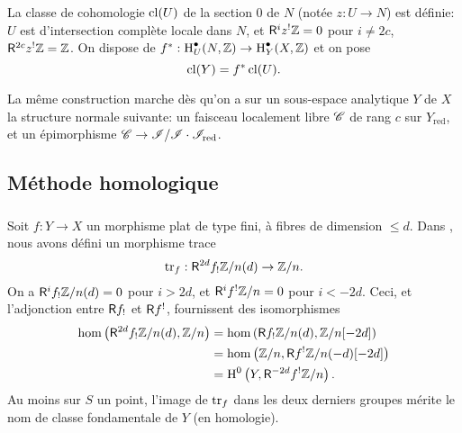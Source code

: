 {La classe de cohomologie $\operatorname{cl}(U)$ de la section $0$ de $N$ (not\'ee $z:U\to N$) 
est d\'efinie: $U$ est d'intersection compl\`ete locale dans $N$, et 
$\mathsf{R}^i z^!\mathbb{Z} = 0$ pour $i\ne 2 c$, $\mathsf{R}^{2 c} z^!\mathbb{Z} = \mathbb{Z}$. On dispose de 
$f^*:\operatorname{H}_U^\bullet(N,\mathbb{Z}) \to \operatorname{H}_Y^\bullet(X,\mathbb{Z})$ et on pose 
\[
  \operatorname{cl}(Y) = f^*\operatorname{cl}(U) \text{.}
\]

La m\^eme construction marche d\`es qu'on a sur un sous-espace analytique $Y$ 
de $X$ la structure normale suivante: un faisceau localement libre $\mathscr{C}$ de 
rang $c$ sur $Y_\text{red}$, et un \'epimorphisme 
$\mathscr{C}\to \mathscr{I}/\mathscr{I}\cdot \mathscr{I}_\text{red}$. 










\subsection{M\'ethode homologique}\label{IV:2-3}





\subsubsection{}\label{IV:2-3-1}

Soit $f:Y\to X$ un morphisme plat de type fini, \`a fibres de dimension 
$\leqslant d$. Dans \cite[XVIII 2.9]{sga4}, nous avons d\'efini un morphisme 
trace 
\begin{equation}\label{IV:eq:2-3-1-1}
  \operatorname{tr}_f:\mathsf{R}^{2 d} f_! \mathbb{Z}/n(d) \to \mathbb{Z}/n \text{.}
\end{equation}
On a $\mathsf{R}^i f_!\mathbb{Z}/n(d)=0$ pour $i>2 d$, et $\mathsf{R}^i f^!\mathbb{Z}/n=0$ pour $i<-2 d$. 
Ceci, et l'adjonction entre $\mathsf{R} f_!$ et $\mathsf{R} f^!$, fournissent des isomorphismes 
\begin{equation}\label{IV:eq:2-1-3-2}
\begin{aligned}
  \hom\left(\mathsf{R}^{2 d}f_!\mathbb{Z}/n(d),\mathbb{Z}/n\right) 
    &= \hom\left(\mathsf{R} f_!\mathbb{Z}/n(d),\mathbb{Z}/n[-2 d]\right) \\
    &= \hom\left(\mathbb{Z}/n,\mathsf{R} f^!\mathbb{Z}/n(-d)[-2 d]\right) \\
    &= \operatorname{H}^0\left(Y,\mathsf{R}^{-2 d}f^!\mathbb{Z}/n\right) \text{.}
\end{aligned}
\end{equation}
Au moins sur $S$ un point, l'image de $\operatorname{tr}_f$ dans les deux derniers groupes 
m\'erite le nom de classe fondamentale de $Y$ (en homologie). 

}
